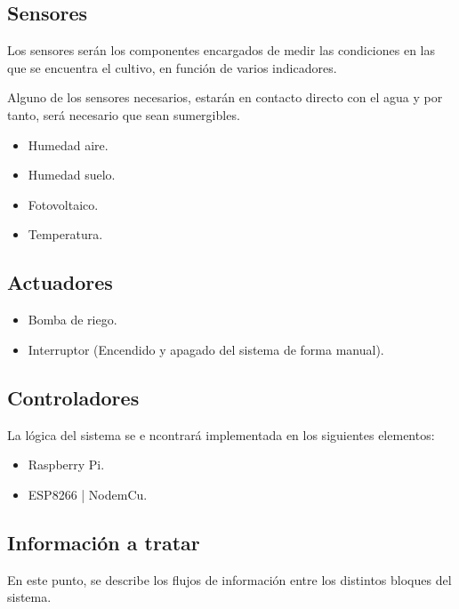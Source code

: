 \documentclass[12pt,a4paper,titlepage,oneside]{report}
\begin{document}
	\subsection*{Sensores}
	Los sensores serán los componentes encargados de medir las condiciones en las que se encuentra el cultivo, en función de varios indicadores.

Alguno de los sensores necesarios, estarán en contacto directo con el agua y por tanto, será necesario que sean sumergibles.\cite{sensores}
		\begin{itemize}
			\item Humedad aire.
			\item Humedad suelo.
			\item Fotovoltaico.
			\item Temperatura.
		\end{itemize}

	\subsection*{Actuadores}

		\begin{itemize}
			\item Bomba de riego.
			\item Interruptor (Encendido y apagado del sistema de forma manual).
		\end{itemize}			
	
	\subsection*{Controladores}
	La lógica del sistema se e ncontrará implementada en los siguientes elementos:
		\begin{itemize}
			\item Raspberry Pi.
			\item ESP8266 | NodemCu.
		\end{itemize}			

	
	\subsection*{Información a tratar}
	En este punto, se describe los flujos de información entre los distintos bloques del sistema.
\end{document}
